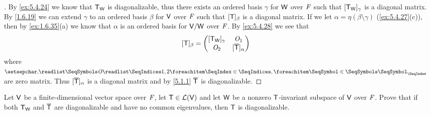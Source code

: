 \begin{proof}[]
	By \cref{ex:5.4.24} we know that \(\mathsf{T}_{\mathsf{W}}\) is diagonalizable, thus there exists an ordered basis \(\gamma\) for \(\mathsf{W}\) over \(\mathit{F}\) such that \([\mathsf{T}_{\mathsf{W}}]_{\gamma}\) is a diagonal matrix.
	By \cref{1.6.19} we can extend \(\gamma\) to an ordered basis \(\beta\) for \(\mathsf{V}\) over \(\mathit{F}\) such that \([\mathsf{T}]_{\beta}\) is a diagonal matrix.
	If we let \(\alpha = \eta(\beta \setminus \gamma)\) (\cref{ex:5.4.27}(c)), then by \cref{ex:1.6.35}(a) we know that \(\alpha\) is an ordered basis for \(\mathsf{V} / \mathsf{W}\) over \(\mathit{F}\).
	By \cref{ex:5.4.28} we see that
	\[
		[\mathsf{T}]_{\beta} = \begin{pmatrix}
			[\mathsf{T}_{\mathsf{W}}]_{\gamma} & \mathit{O}_1                    \\
			\mathit{O}_2              & [\overline{\mathsf{T}}]_{\alpha}
		\end{pmatrix}
	\]
	where \(\seq{\zm}{1,2}\) are zero matrix.
	Thus \([\overline{\mathsf{T}}]_{\alpha}\) is a diagonal matrix and by \cref{5.1.1} \(\overline{\mathsf{T}}\) is diagonalizable.
\end{proof}

\begin{ex}\label{ex:5.4.30}
	Let \(\mathsf{V}\) be a finite-dimensional vector space over \(\mathit{F}\), let \(\mathsf{T} \in \mathcal{L}(\mathsf{V})\) and let \(\mathsf{W}\) be a nonzero \(\mathsf{T}\)-invariant subspace of \(\mathsf{V}\) over \(\mathit{F}\).
	Prove that if both \(\mathsf{T}_{\mathsf{W}}\) and \(\overline{\mathsf{T}}\) are diagonalizable and have no common eigenvalues, then \(\mathsf{T}\) is diagonalizable.
\end{ex}

